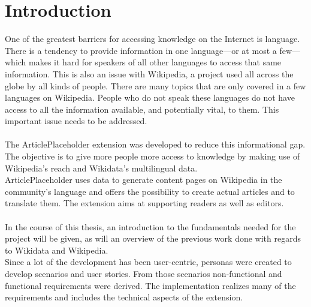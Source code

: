 \chapter{Introduction}

One of the greatest barriers for accessing knowledge on the Internet is language. There is a tendency to provide information in one language---or at most a few---which makes it hard for speakers of all other languages to access that same information. This is also an issue with Wikipedia, a project used all across the globe by all kinds of people. There are many topics that are only covered in a few languages on Wikipedia. People who do not speak these languages do not have access to all the information available, and potentially vital, to them. This important issue needs to be addressed. \\
\\
The ArticlePlaceholder extension was developed to reduce this informational gap. The objective is to give more people more access to knowledge by making use of Wikipedia’s reach and Wikidata’s multilingual data. \\
ArticlePlaceholder uses data to generate content pages on Wikipedia in the community's language and offers the possibility to create actual articles and to translate them. The extension aims at supporting readers as well as editors. \\
\\
In the course of this thesis, an introduction to the fundamentals needed for the project will be given, as will an overview of the previous work done with regards to Wikidata and Wikipedia. \\
Since a lot of the development has been user-centric, personas were created to develop scenarios and user stories. From those scenarios non-functional and functional requirements were derived. The implementation realizes many of the requirements and includes the technical aspects of the extension.